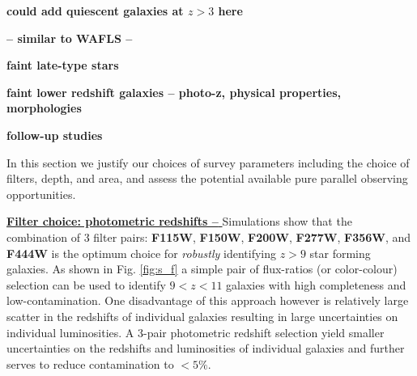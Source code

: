 \documentclass[12pt]{article}
\begin{document}
{\bf could add quiescent galaxies at $z>3$ here}

{\bf -- similar to WAFLS --}

{\bf faint late-type stars}

{\bf faint lower redshift galaxies -- photo-z, physical properties, morphologies}

{\bf follow-up studies}





%
%

\clearpage

\justifyobservations   %

In this section we justify our choices of survey parameters including the choice of filters, depth, and area, and assess the potential available pure parallel observing opportunities.

\vspace{5mm}
\noindent
\underline{\bf Filter choice: photometric redshifts -- } Simulations show that the combination of 3 filter pairs: {\bf F115W}, {\bf F150W}, {\bf F200W}, {\bf F277W}, {\bf F356W}, and {\bf F444W} is the optimum choice for \emph{robustly} identifying $z>9$ star forming galaxies. As shown in Fig. \ref{fig:s_f} a simple pair of flux-ratios (or color-colour) selection can be used to identify $9<z<11$ galaxies with high completeness and low-contamination. One disadvantage of this approach however is relatively large scatter in the redshifts of individual galaxies resulting in large uncertainties on individual luminosities. A 3-pair photometric redshift selection yield smaller uncertainties on the redshifts and luminosities of individual galaxies and further serves to reduce contamination to $<5\%$.
\end{document}
